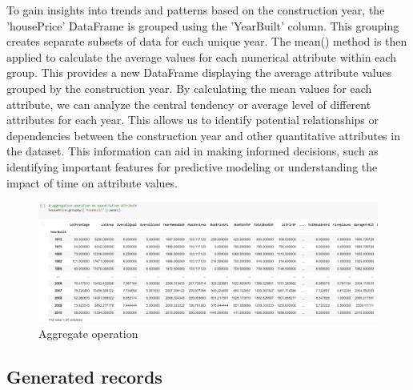 To gain insights into trends and patterns based on the construction year, the 'housePrice' DataFrame is grouped using the 'YearBuilt' column. This grouping creates separate subsets of data for each unique year. The mean() method is then applied to calculate the average values for each numerical attribute within each group. This provides a new DataFrame displaying the average attribute values grouped by the construction year.
By calculating the mean values for each attribute, we can analyze the central tendency or average level of different attributes for each year. This allows us to identify potential relationships or dependencies between the construction year and other quantitative attributes in the dataset.
This information can aid in making informed decisions, such as identifying important features for predictive modeling or understanding the impact of time on attribute values.

\begin{figure}[t]
    \includegraphics[scale=0.35]{imgs/aggregate_operation.png}
    \centering
    \caption{Aggregate operation}
    \hrulefill\vspace{15pt}\par
\end{figure}


\subsection{Generated records}

